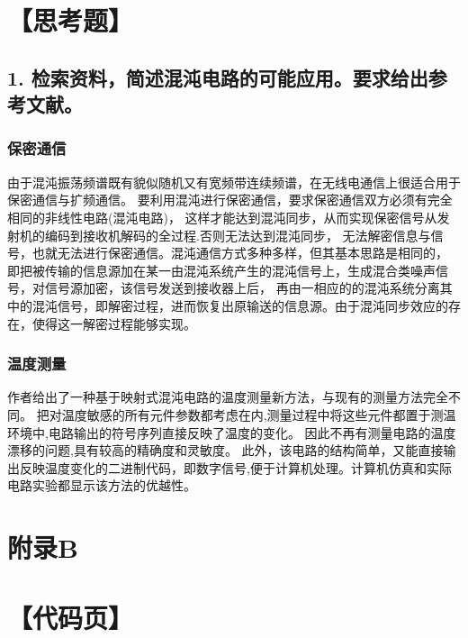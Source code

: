 \documentclass[10pt,a4paper,twoside,UTF8]{ctexart}
\begin{document}
\section*{【思考题】}
\subsection*{1. 检索资料，简述混沌电路的可能应用。要求给出参考文献。}
\subsubsection*{保密通信}
由于混沌振荡频谱既有貌似随机又有宽频带连续频谱，在无线电通信上很适合用于保密通信与扩频通信。
要利用混沌进行保密通信，要求保密通信双方必须有完全相同的非线性电路(混沌电路)，
这样才能达到混沌同步，从而实现保密信号从发射机的编码到接收机解码的全过程.否则无法达到混沌同步，
无法解密信息与信号，也就无法进行保密通信。混沌通信方式多种多样，但其基本思路是相同的，
即把被传输的信息源加在某一由混沌系统产生的混沌信号上，生成混合类噪声信号，对信号源加密，该信号发送到接收器上后，
再由一相应的的混沌系统分离其中的混沌信号，即解密过程，进而恢复出原输送的信息源。由于混沌同步效应的存在，使得这一解密过程能够实现\autocite{S1}。
\subsubsection*{温度测量}
作者给出了一种基于映射式混沌电路的温度测量新方法，与现有的测量方法完全不同。
把对温度敏感的所有元件参数都考虑在内,测量过程中将这些元件都置于测温环境中,电路输出的符号序列直接反映了温度的变化。
因此不再有测量电路的温度漂移的问题,具有较高的精确度和灵敏度。
此外，该电路的结构简单，又能直接输出反映温度变化的二进制代码，即数字信号,便于计算机处理。计算机仿真和实际电路实验都显示该方法的优越性\autocite{S2}。

\newpage
\section*{\LARGE 附录B}
\section*{【代码页】}
\end{document}
